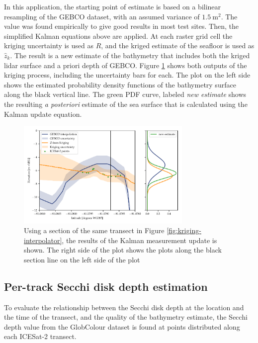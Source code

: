 In this application, the starting point of estimate is based on a bilinear resampling of the GEBCO dataset, with an assumed variance of $1.5~\text{m}^2$. The value was found empirically to give good results in most test sites. Then, the simplified Kalman equations above are applied. At each raster grid cell the kriging uncertainty is used as $R$, and the kriged estimate of the seafloor is used as $\hat{z}_k$. The result is a new estimate of the bathymetry that includes both the kriged lidar surface and a priori depth of GEBCO. Figure \ref{fig:Kalman-figure} shows both outputs of the kriging process, including the uncertainty bars for each. The plot on the left side shows the estimated probability density functions of the bathymetry surface along the black vertical line. The green PDF curve, labeled \emph{new estimate} shows the resulting \emph{a posteriori} estimate of the sea surface that is calculated using the Kalman update equation.

\begin{figure}[htb]
    \centering
    \includegraphics[width=0.75\textwidth]{figures/methodology-Kalman-updating.pdf}
    \caption[Results of combination via Kalman updating]{Using a section of the same transect in Figure \ref{fig:kriging-interpolator}, the results of the Kalman measurement update is shown. The right side of the plot shows the plots along the black section line on the left side of the plot}
    \label{fig:Kalman-figure}
\end{figure}

\subsection{Per-track Secchi disk depth estimation}
To evaluate the relationship between the Secchi disk depth at the location and the time of the transect, and the quality of the bathymetry estimate, the Secchi depth value from the GlobColour dataset \parencite{Garnesson2019} is found at points distributed along each ICESat-2 transect. 

